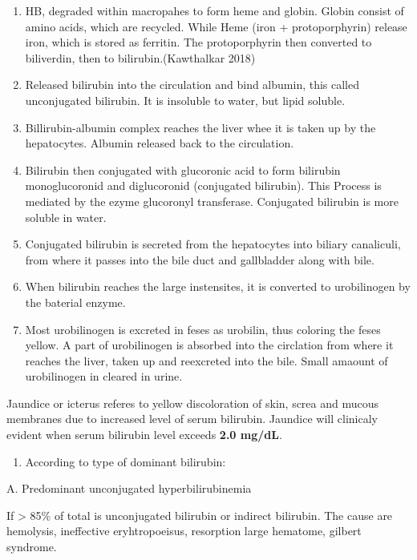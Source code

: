 \documentclass[
  letterpaper,
  DIV=11,
  numbers=noendperiod]{scrreprt}
\providecommand{\tightlist}{%
  \setlength{\itemsep}{0pt}\setlength{\parskip}{0pt}}\usepackage{longtable,booktabs,array}
\begin{document}
\begin{enumerate}
\def\labelenumi{\arabic{enumi}.}
\item
  HB, degraded within macropahes to form heme and globin. Globin consist
  of amino acids, which are recycled. While Heme (iron + protoporphyrin)
  release iron, which is stored as ferritin. The protoporphyrin then
  converted to biliverdin, then to bilirubin.(Kawthalkar 2018)
\item
  Released bilirubin into the circulation and bind albumin, this called
  unconjugated bilirubin. It is insoluble to water, but lipid soluble.
\item
  Billirubin-albumin complex reaches the liver whee it is taken up by
  the hepatocytes. Albumin released back to the circulation.
\item
  Bilirubin then conjugated with glucoronic acid to form bilirubin
  monoglucoronid and diglucoronid (conjugated bilirubin). This Process
  is mediated by the ezyme glucoronyl transferase. Conjugated bilirubin
  is more soluble in water.
\item
  Conjugated bilirubin is secreted from the hepatocytes into biliary
  canaliculi, from where it passes into the bile duct and gallbladder
  along with bile.
\item
  When bilirubin reaches the large instensites, it is converted to
  urobilinogen by the baterial enzyme.
\item
  Most urobilinogen is excreted in feses as urobilin, thus coloring the
  feses yellow. A part of urobilinogen is absorbed into the circlation
  from where it reaches the liver, taken up and reexcreted into the
  bile. Small amaount of urobilinogen in cleared in urine.
\end{enumerate}

Jaundice or icterus referes to yellow discoloration of skin, screa and
mucous membranes due to increased level of serum bilirubin. Jaundice
will clinicaly evident when serum bilirubin level exceeds \textbf{2.0
mg/dL}.

\begin{enumerate}
\def\labelenumi{\arabic{enumi}.}
\tightlist
\item
  According to type of dominant bilirubin:
\end{enumerate}

A. Predominant unconjugated hyperbilirubinemia

If \textgreater{} 85\% of total is unconjugated bilirubin or indirect
bilirubin. The cause are hemolysis, ineffective eryhtropoeisus,
resorption large hematome, gilbert syndrome.
\end{document}
